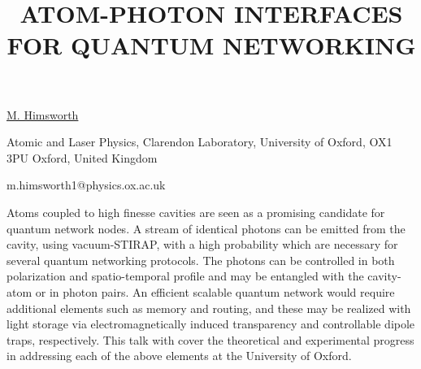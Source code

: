 \title{ATOM-PHOTON INTERFACES FOR QUANTUM NETWORKING}

\underline{M. Himsworth} 

{\normalsize{\vspace{-4mm}
Atomic and Laser Physics, Clarendon Laboratory, University of Oxford, OX1 3PU Oxford, United Kingdom

\email m.himsworth1@physics.ox.ac.uk}}

Atoms coupled to high finesse cavities are seen as a promising candidate for quantum network nodes. A stream of identical photons can be emitted from the cavity, using vacuum-STIRAP, with a high probability which are necessary for several quantum networking protocols. The photons can be controlled in both polarization and spatio-temporal profile and may be entangled with the cavity-atom or in photon pairs.
An efficient scalable quantum network would require additional elements such as memory and routing, and these may be realized with light storage via electromagnetically induced transparency and controllable dipole traps, respectively. This talk with cover the theoretical and experimental progress in addressing each of the above elements at the University of Oxford.

\vspace{\baselineskip} 